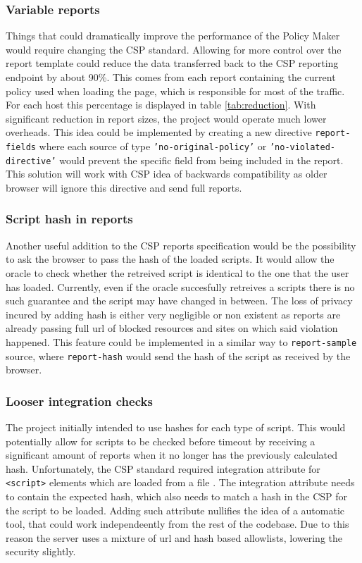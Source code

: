 \begin{description}
\subsubsection{Variable reports}

Things that could dramatically improve the performance of the Policy Maker would require changing the CSP standard.
Allowing for more control over the report template could reduce the data transferred back to the CSP reporting endpoint by about 90\%.
This comes from each report containing the current policy used when loading the page, which is responsible for most of the traffic.
For each host this percentage is displayed in table \ref{tab:reduction}.
With significant reduction in report sizes, the project would operate much lower overheads.
This idea could be implemented by creating a new directive \texttt{report-fields} where each source of type \texttt{'no-original-policy'} or \texttt{'no-violated-directive'} would prevent the specific field from being included in the report.
This solution will work with CSP idea of backwards compatibility as older browser will ignore this directive and send full reports.



\subsubsection{Script hash in reports}

Another useful addition to the CSP reports specification would be the possibility to ask the browser to pass the hash of the loaded scripts.
It would allow the oracle to check whether the retreived script is identical to the one that the user has loaded.
Currently, even if the oracle succesfully retreives a scripts there is no such guarantee and the script may have changed in between.
The loss of privacy incured by adding hash is either very negligible or non existent as reports are already passing full url of blocked resources and sites on which said violation happened.
This feature could be implemented in a similar way to \texttt{report-sample} source, where \texttt{report-hash} would send the hash of the script as received by the browser.

\subsubsection{Looser integration checks}

The project initially intended to use hashes for each type of script. 
This would potentially allow for scripts to be checked before timeout by receiving a significant amount of reports when it no longer has the previously calculated hash.
Unfortunately, the CSP standard required integration attribute for \texttt{<script>} elements which are loaded from a file \cite{externalHash}.
The integration attribute needs to contain the expected hash, which also needs to match a hash in the CSP for the script to be loaded.
Adding such attribute nullifies the idea of a automatic tool, that could work independeently from the rest of the codebase.
Due to this reason the server uses a mixture of url and hash based allowlists, lowering the security slightly.


\end{description}
